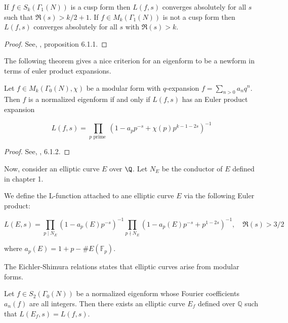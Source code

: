 \begin{proposition}
    If $f \in S_{k}\left(\Gamma_{1}(N)\right)$ is a cusp form then $L(f, s)$ converges absolutely for all $s$ such that $\mathfrak{R}(s)>k / 2+1$. If $f \in M_{k}\left(\Gamma_{1}(N)\right)$ is not a cusp form then $L(f, s)$ converges absolutely for all $s$ with $\mathfrak{R}(s)>k$.

\end{proposition}

\begin{proof}
    See, \cite{Masdeu2015ModularForms}, proposition 6.1.1.
\end{proof}
The following theorem gives a nice criterion for an eigenform to be a newform in terms of euler product expansions. 
\begin{theorem}
    Let $f \in M_{k}\left(\Gamma_{0}(N), \chi\right)$ be a modular form with $q$-expansion $f=\sum_{n>0} a_{n} q^{n}$. Then $f$ is a normalized eigenform if and only if $L(f, s)$ has an Euler product expansion

$$
L(f, s)=\prod_{p \text { prime }}\left(1-a_{p} p^{-s}+\chi(p) p^{k-1-2 s}\right)^{-1}
$$
\end{theorem}

\begin{proof}
    See, \cite{Masdeu2015ModularForms}, 6.1.2.
\end{proof}

Now, consider an elliptic curve $E$ over $\Q$. Let $N_E$ be the conductor of $E$ defined in chapter 1. 

\begin{definition}
We define the L-function attached to ane elliptic curve $E$ via the following Euler product:

$$
L(E, s)=\prod_{p \mid N_{E}}\left(1-a_{p}(E) p^{-s}\right)^{-1} \prod_{p \nmid N_{E}}\left(1-a_{p}(E) p^{-s}+p^{1-2 s}\right)^{-1}, \quad \Re(s)>3 / 2
$$

where $a_{p}(E)=1+p-\# E\left(\mathbb{F}_{p}\right)$. 

\end{definition}

The Eichler-Shimura relations states that elliptic curves arise from modular forms. 

\begin{theorem}
    Let $f \in S_{2}\left(\Gamma_{0}(N)\right)$ be a normalized eigenform whose Fourier coefficients $a_{n}(f)$ are all integers. Then there exists an elliptic curve $E_{f}$ defined over $\mathbb{Q}$ such that $L\left(E_{f}, s\right)=L(f, s)$.

\end{theorem}


